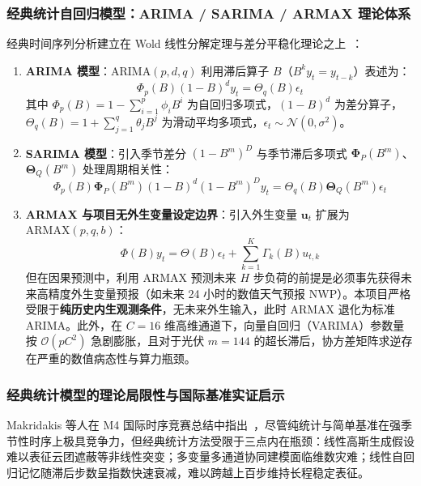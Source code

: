 \subsubsection{经典统计自回归模型：ARIMA / SARIMA / ARMAX 理论体系}
经典时间序列分析建立在 Wold 线性分解定理与差分平稳化理论之上~\cite{box2015time}：
\begin{enumerate}
    \item \textbf{ARIMA 模型}：$\text{ARIMA}(p, d, q)$ 利用滞后算子 $B$（$B^k y_t = y_{t-k}$）表述为：
    \begin{equation}
        \Phi_p(B) (1 - B)^d y_t = \Theta_q(B) \epsilon_t
    \end{equation}
    其中 $\Phi_p(B) = 1 - \sum_{i=1}^p \phi_i B^i$ 为自回归多项式，$(1 - B)^d$ 为差分算子，$\Theta_q(B) = 1 + \sum_{j=1}^q \theta_j B^j$ 为滑动平均多项式，$\epsilon_t \sim \mathcal{N}(0, \sigma^2)$。
    \item \textbf{SARIMA 模型}：引入季节差分 $(1 - B^m)^D$ 与季节滞后多项式 $\boldsymbol{\Phi}_P(B^m)$、$\boldsymbol{\Theta}_Q(B^m)$ 处理周期相关性：
    \begin{equation}
        \Phi_p(B) \boldsymbol{\Phi}_P(B^m) (1 - B)^d (1 - B^m)^D y_t = \Theta_q(B) \boldsymbol{\Theta}_Q(B^m) \epsilon_t
    \end{equation}
    \item \textbf{ARMAX 与项目无外生变量设定边界}：引入外生变量 $\mathbf{u}_t$ 扩展为 $\text{ARMAX}(p, q, b)$：
    \begin{equation}
        \Phi(B) y_t = \Theta(B) \epsilon_t + \sum_{k=1}^K \Gamma_k(B) u_{t, k}
    \end{equation}
    但在因果预测中，利用 ARMAX 预测未来 $H$ 步负荷的前提是必须事先获得未来高精度外生变量预报（如未来 24 小时的数值天气预报 NWP）。本项目严格受限于\textbf{纯历史内生观测条件}，无未来外生输入，此时 ARMAX 退化为标准 ARIMA。此外，在 $C=16$ 维高维通道下，向量自回归（VARIMA）参数量按 $\mathcal{O}(p C^2)$ 急剧膨胀，且对于光伏 $m=144$ 的超长滞后，协方差矩阵求逆存在严重的数值病态性与算力瓶颈。
\end{enumerate}

\subsubsection{经典统计模型的理论局限性与国际基准实证启示}
Makridakis 等人在 M4 国际时序竞赛总结中指出~\cite{makridakis2018m4}，尽管纯统计与简单基准在强季节性时序上极具竞争力，但经典统计方法受限于三点内在瓶颈：线性高斯生成假设难以表征云团遮蔽等非线性突变；多变量多通道协同建模面临维数灾难；线性自回归记忆随滞后步数呈指数快速衰减，难以跨越上百步维持长程稳定表征。

